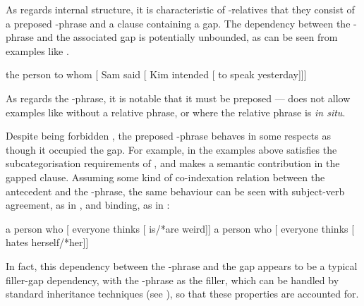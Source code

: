 \documentclass[output=paper
 	        ,biblatex
                ,babelshorthands
                ,newtxmath
                ,draftmode
                ,colorlinks, citecolor=brown
]{langscibook}
\begin{document}
As regards internal structure, it is characteristic of -relatives that
they consist of a preposed -phrase and a clause containing a gap.
The dependency between the -phrase and the associated gap is potentially
unbounded, as can be seen from examples like .
\begin{exe}\ex\label{x:rc-11}
  the person to whom [ Sam said [ Kim intended [ to speak \trace yesterday]]]
\end{exe}
As regards the -phrase, it is notable that it must be preposed --- 
does not allow examples like  without a relative phrase, or  where
the relative phrase is \emph{in situ}.
\begin{exe}\ex\begin{xlist}\label{x:rc-8}
\end{xlist}\end{exe}
Despite being forbidden , the preposed -phrase behaves in some
respects as though it occupied the gap. For example, in the  examples above 
satisfies the subcategorisation requirements of , and makes a semantic
contribution in the gapped clause.  Assuming some kind of co-indexation relation
between the antecedent and the -phrase, the same behaviour can be seen with
subject-verb agreement, as in , and binding, as in :
\begin{exe}\ex\begin{xlist}
  \ex\label{x:rc-166} a person who [ everyone thinks [ \trace is/*are weird]]
  \ex\label{x:rc-167} a person who [ everyone thinks [ \trace hates herself/*her]]
\end{xlist}\end{exe}
In fact, this dependency between the -phrase and the gap appears to be a typical
filler-gap dependency, with the -phrase as the filler,  which can be handled by
standard  inheritance techniques (see ), so that these
properties are accounted for.
\end{document}
